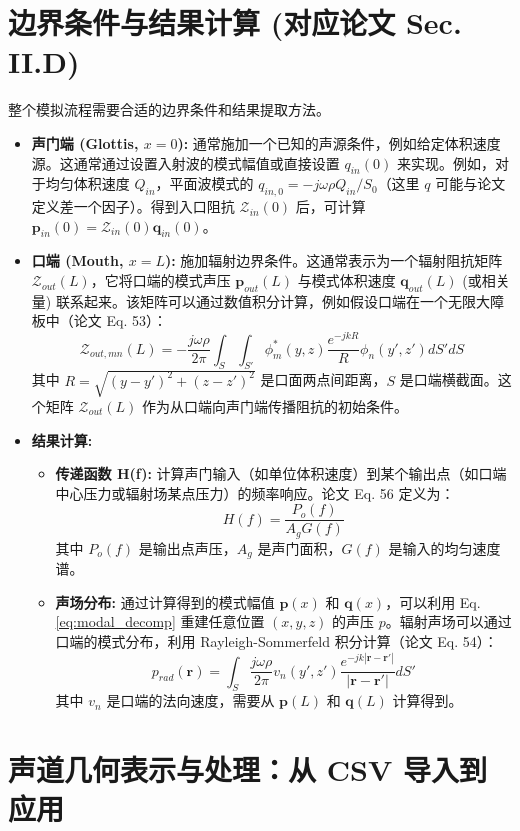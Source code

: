 \documentclass{ctexart}
\begin{document}
\section{边界条件与结果计算 (对应论文 Sec. II.D)}
整个模拟流程需要合适的边界条件和结果提取方法。
\begin{itemize}
    \item \textbf{声门端 (Glottis, $x=0$):} 通常施加一个已知的声源条件，例如给定体积速度源。这通常通过设置入射波的模式幅值或直接设置 $q_{in}(0)$ 来实现。例如，对于均匀体积速度 $Q_{in}$，平面波模式的 $q_{in, 0} = -j\omega\rho Q_{in} / S_0$（这里 $q$ 可能与论文定义差一个因子）。得到入口阻抗 $\boldsymbol{\mathcal{Z}}_{in}(0)$ 后，可计算 $\mathbf{p}_{in}(0) = \boldsymbol{\mathcal{Z}}_{in}(0) \mathbf{q}_{in}(0)$。
    \item \textbf{口端 (Mouth, $x=L$):} 施加辐射边界条件。这通常表示为一个辐射阻抗矩阵 $\boldsymbol{\mathcal{Z}}_{out}(L)$，它将口端的模式声压 $\mathbf{p}_{out}(L)$ 与模式体积速度 $\mathbf{q}_{out}(L)$ (或相关量) 联系起来。该矩阵可以通过数值积分计算，例如假设口端在一个无限大障板中（论文 Eq. 53）：
    \[
    \mathcal{Z}_{out, mn}(L) = -\frac{j\omega\rho}{2\pi} \int_S \int_{S'} \phi_m^*(y,z) \frac{e^{-jkR}}{R} \phi_n(y',z') dS' dS
    \]
    其中 $R = \sqrt{(y-y')^2 + (z-z')^2}$ 是口面两点间距离，$S$ 是口端横截面。这个矩阵 $\boldsymbol{\mathcal{Z}}_{out}(L)$ 作为从口端向声门端传播阻抗的初始条件。
    \item \textbf{结果计算:}
        \begin{itemize}
            \item \textbf{传递函数 H(f):} 计算声门输入（如单位体积速度）到某个输出点（如口端中心压力或辐射场某点压力）的频率响应。论文 Eq. 56 定义为：
            \[ H(f) = \frac{P_o(f)}{A_g G(f)} \]
            其中 $P_o(f)$ 是输出点声压，$A_g$ 是声门面积，$G(f)$ 是输入的均匀速度谱。
            \item \textbf{声场分布:} 通过计算得到的模式幅值 $\mathbf{p}(x)$ 和 $\mathbf{q}(x)$，可以利用 Eq. \eqref{eq:modal_decomp} 重建任意位置 $(x,y,z)$ 的声压 $p$。辐射声场可以通过口端的模式分布，利用 Rayleigh-Sommerfeld 积分计算（论文 Eq. 54）：
            \[ p_{rad}(\mathbf{r}) = \int_S \frac{j\omega\rho}{2\pi} v_n(y', z') \frac{e^{-jk|\mathbf{r}-\mathbf{r}'|}}{|\mathbf{r}-\mathbf{r}'|} dS' \]
            其中 $v_n$ 是口端的法向速度，需要从 $\mathbf{p}(L)$ 和 $\mathbf{q}(L)$ 计算得到。
        \end{itemize}
\end{itemize}

\section{声道几何表示与处理：从 CSV 导入到应用}
\end{document}
